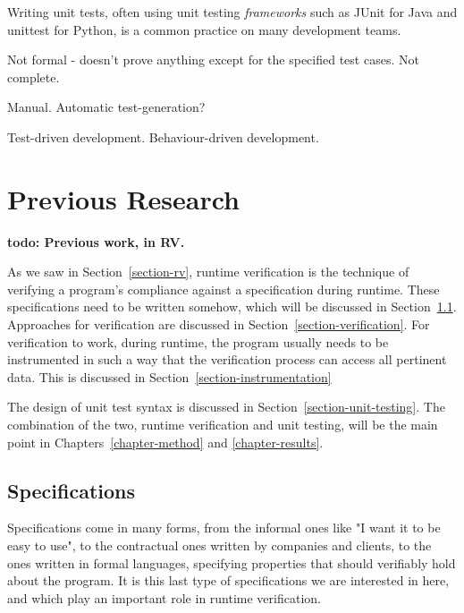 \documentclass[a4paper,11pt]{kth-mag}
\newcommand{\todo}[1]{\textbf{todo: #1}}
\begin{document}
Writing unit tests, often using unit testing \textit{frameworks} such as JUnit
\cite{junit} for Java and unittest \cite{python-unittest} for Python, is a
common practice on many development teams.

Not formal - doesn't prove anything except for the specified test cases. Not
complete.

Manual. Automatic test-generation?

Test-driven development. Behaviour-driven development.





\pagestyle{newchap}
\chapter{Previous Research} \label{chapter-previous-research}

\todo{Previous work, in RV.}

As we saw in Section~\ref{section-rv}, runtime verification is the technique of
verifying a program's compliance against a specification during runtime. These
specifications need to be written somehow, which will be discussed in
Section~\ref{section-specifications}. Approaches for verification are discussed
in Section~\ref{section-verification}. For verification to work, during
runtime,
the program usually needs to be instrumented in such a way that the
verification process can access all pertinent data. This is discussed in
Section~\ref{section-instrumentation}

The design of unit test syntax is discussed in Section~\ref{section-unit-testing}. The combination of the two, runtime verification
and unit testing, will be the main point in Chapters~\ref{chapter-method} and
\ref{chapter-results}.


\section{Specifications} \label{section-specifications}

Specifications come in many forms, from the informal ones like "I want it to be
easy to use", to the contractual ones written by companies and clients, to the
ones written in formal languages, specifying properties that should verifiably
hold about the program. It is this last type of specifications we are
interested in here, and which play an important role in runtime verification.
\end{document}
